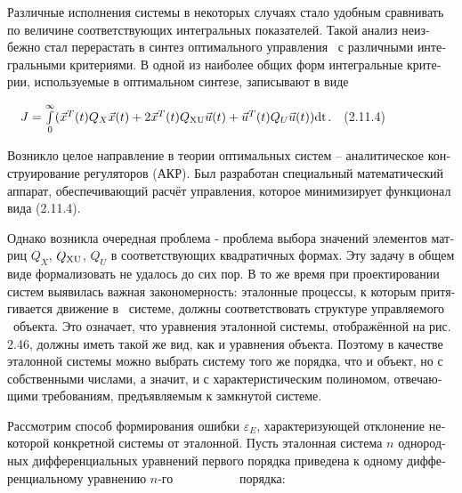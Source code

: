\documentclass[a4paper]{article}
\newcommand\normalsubformula[1]{\text{\mathversion{normal}$#1$}}
\begin{document}
{\begin{russian}\sffamily
Различные исполнения системы в некоторых случаях стало удобным сравнивать по величине соответствующих интегральных
показателей. Такой анализ неизбежно стал перерастать в синтез оптимального управления \ с различными интегральными
критериями. В одной из наиболее общих форм интегральные критерии, используемые в оптимальном синтезе, записывают в виде
\end{russian}}

{\begin{russian}\sffamily
\ \  $J=\overset{\infty }{\underset 0{\int }}(\vec x^T(t)Q_X\vec x(t)+2\vec x^T(t)Q_{\normalsubformula{\text{XU}}}\vec
u(t)+\vec u^T(t)Q_U\vec u(t))\normalsubformula{\text{dt}}$.\ \ (2.11.4)
\end{russian}}

{\begin{russian}\sffamily
Возникло целое направление в теории оптимальных систем – аналитическое конструирование регуляторов (АКР). Был разработан
специальный математический аппарат, обеспечивающий расчёт управления, которое минимизирует функционал вида (2.11.4).
\end{russian}}

{\begin{russian}\sffamily
Однако возникла очередная проблема - проблема выбора значений элементов матриц  $Q_X$, 
$Q_{\normalsubformula{\text{XU}}}$,  $Q_U$ в соответствующих квадратичных формах. Эту задачу в общем виде формализовать
не удалось до сих пор. В то же время при проектировании систем выявилась важная закономерность: эталонные процессы, к
которым притягивается движение в \ системе, должны соответствовать структуре управляемого \ объекта. Это означает, что
уравнения эталонной системы, отображённой на рис. 2.46, должны иметь такой же вид, как и уравнения объекта. Поэтому в
качестве эталонной системы можно выбрать систему того же порядка, что и объект, но с собственными числами, а значит, и
с характеристическим полиномом, отвечающими требованиям, предъявляемым к замкнутой системе.
\end{russian}}

{\begin{russian}\sffamily
Рассмотрим способ формирования ошибки  $ε_E$, характеризующей отклонение некоторой конкретной системы от эталонной.
Пусть эталонная система  $n$ однородных дифференциальных уравнений первого порядка приведена к одному дифференциальному
уравнению  $n$-го \ \ \ \ \ \ \ \ \ \ порядка:
\end{russian}}
\end{document}
